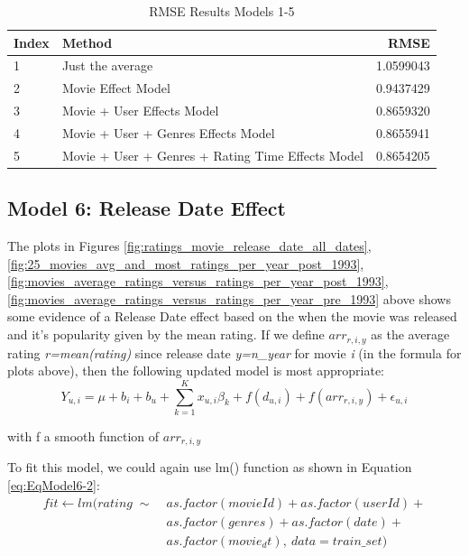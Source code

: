 \documentclass[
]{article}
\begin{document}
\begin{table}[H]

\caption{\label{tab:rte_5}RMSE Results Models 1-5\label{tbl:rmse_results_model_1-5}}
\centering
\fontsize{7}{9}\selectfont
\begin{tabular}[t]{llr}
\toprule
Index & Method & RMSE\\
\midrule
1 & Just the average & 1.0599043\\
2 & Movie Effect Model & 0.9437429\\
3 & Movie + User Effects Model & 0.8659320\\
4 & Movie + User + Genres Effects Model & 0.8655941\\
5 & Movie + User + Genres + Rating Time Effects Model & 0.8654205\\
\bottomrule
\end{tabular}
\end{table}

\newpage

\hypertarget{model-6-release-date-effect}{%
\subsection{Model 6: Release Date
Effect}\label{model-6-release-date-effect}}

The plots in Figures \ref{fig:ratings_movie_release_date_all_dates},
\ref{fig:25_movies_avg_and_most_ratings_per_year_post_1993},
\ref{fig:movies_average_ratings_versus_ratings_per_year_post_1993},
\ref{fig:movies_average_ratings_versus_ratings_per_year_pre_1993} above
shows some evidence of a Release Date effect based on the when the movie
was released and it's popularity given by the mean rating. If we define
\(arr_{r,i,y}\) as the average rating \emph{r=mean(rating)} since
release date \emph{y=n\_year} for movie \emph{i} (in the formula for
plots above), then the following updated model is most appropriate:\\
%
\label{eq:EqModel6-1} \begin{equation}
  Y_{u,i} = \mu + b_{i} + b_{u} + \sum_{k=1}^Kx_{u,i}\beta_k + f(d_{u,i}) + f(arr_{r,i,y}) + \epsilon_{u,i}
\end{equation}

\begin{center}
with f a smooth function of $arr_{r,i,y}$
\end{center}

To fit this model, we could again use lm() function as shown in Equation
\ref{eq:EqModel6-2}: %
\label{eq:EqModel6-2} \begin{equation}
\begin{split}
  fit \leftarrow lm(rating \; \sim \; & as.factor(movieId) + as.factor(userId) + \\ 
  & as.factor(genres) + as.factor(date) + \\ 
  & as.factor(movie_dt), \: data = train\_{}set)
\end{split}
\end{equation}
\end{document}
